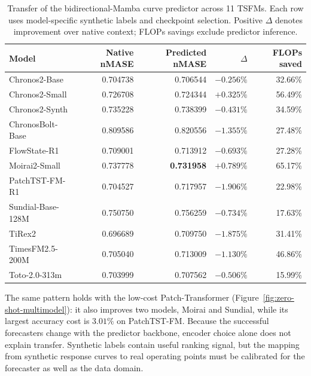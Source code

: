 \begin{table}[t]
    \centering
    \footnotesize
    \setlength{\tabcolsep}{5pt}
    \caption{Transfer of the bidirectional-Mamba curve predictor across 11
    TSFMs.  Each row uses model-specific synthetic labels and checkpoint
    selection.  Positive $\Delta$ denotes improvement over native context;
    FLOPs savings exclude predictor inference.}
    \label{tab:zero-shot-multimodel}
    \begin{tabular}{lrrrr}
        \toprule
        Model & Native nMASE & Predicted nMASE & $\Delta$ & FLOPs saved \\
        \midrule
        Chronos2-Base       & 0.704738 & 0.706544 & $-0.256\%$ & 32.66\% \\
        Chronos2-Small      & 0.726708 & 0.724344 & $+0.325\%$ & 56.49\% \\
        Chronos2-Synth      & 0.735228 & 0.738399 & $-0.431\%$ & 34.59\% \\
        ChronosBolt-Base    & 0.809586 & 0.820556 & $-1.355\%$ & 27.48\% \\
        FlowState-R1        & 0.709001 & 0.713912 & $-0.693\%$ & 27.28\% \\
        Moirai2-Small       & 0.737778 & \textbf{0.731958} & $\mathbf{+0.789\%}$ & 65.17\% \\
        PatchTST-FM-R1      & 0.704527 & 0.717957 & $-1.906\%$ & 22.98\% \\
        Sundial-Base-128M   & 0.750750 & 0.756259 & $-0.734\%$ & 17.63\% \\
        TiRex2              & 0.696689 & 0.709750 & $-1.875\%$ & 31.41\% \\
        TimesFM2.5-200M     & 0.705040 & 0.713009 & $-1.130\%$ & 46.86\% \\
        Toto-2.0-313m       & 0.703999 & 0.707562 & $-0.506\%$ & 15.99\% \\
        \bottomrule
    \end{tabular}
\end{table}

The same pattern holds with the low-cost Patch-Transformer
(Figure~\ref{fig:zero-shot-multimodel}): it also improves two models, Moirai and
Sundial, while its largest accuracy cost is $3.01\%$ on PatchTST-FM.  Because
the successful forecasters change with the predictor backbone, encoder choice
alone does not explain transfer.  Synthetic labels contain useful ranking
signal, but the mapping from synthetic response curves to real operating points
must be calibrated for the forecaster as well as the data domain.

